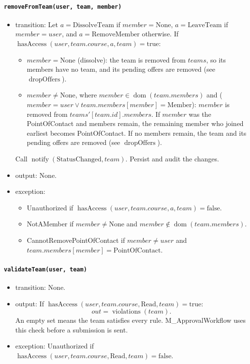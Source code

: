 \documentclass[12pt, titlepage]{article}
\begin{document}
\paragraph{\texttt{removeFromTeam(user, team, member)}}
\begin{itemize}
    \item transition: Let $a=\text{DissolveTeam}$ if $member=\text{None}$, $a=\text{LeaveTeam}$ if $member=user$, and $a=\text{RemoveMember}$ otherwise. If $\operatorname{hasAccess}(user,team.course,a,team)=\text{true}$:
    \begin{itemize}
        \item $member=\text{None}$ (dissolve): the team is removed from $\mathit{teams}$, so its members have no team, and its pending offers are removed (see $\operatorname{dropOffers}$).
        \item $member\ne\text{None}$, where $member\in\operatorname{dom}(team.members)$ and ($member=user\lor team.members[member]=\text{Member}$): $member$ is removed from $\mathit{teams}'[team.id].members$. If $member$ was the PointOfContact and members remain, the remaining member who joined earliest becomes PointOfContact. If no members remain, the team and its pending offers are removed (see $\operatorname{dropOffers}$).
    \end{itemize}
    Call $\operatorname{notify}(\text{StatusChanged},team)$. Persist and audit the changes.
    \item output: None.
    \item exception:
    \begin{itemize}
        \item Unauthorized if $\operatorname{hasAccess}(user,team.course,a,team)=\text{false}$.
        \item NotAMember if $member\ne\text{None}$ and $member\notin\operatorname{dom}(team.members)$.
        \item CannotRemovePointOfContact if $member\ne user$ and $team.members[member]=\text{PointOfContact}$.
    \end{itemize}
\end{itemize}

\paragraph{\texttt{validateTeam(user, team)}}
\begin{itemize}
    \item transition: None.
    \item output: If $\operatorname{hasAccess}(user,team.course,\text{Read},team)=\text{true}$:
    \[
    out=\operatorname{violations}(team).
    \]
    An empty set means the team satisfies every rule. M\_ApprovalWorkflow uses this check before a submission is sent.
    \item exception: Unauthorized if $\operatorname{hasAccess}(user,team.course,\text{Read},team)=\text{false}$.
\end{itemize}
\end{document}

